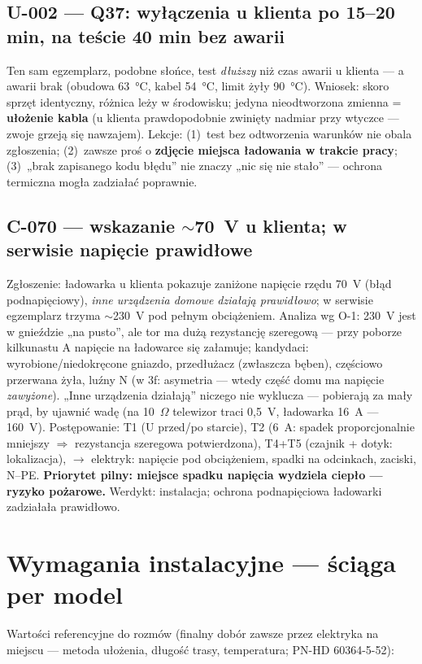\documentclass[11pt]{article}
\newcommand{\key}[1]{\textbf{\color{navy}#1}}
\newcommand{\warn}[1]{\textbf{\color{warnred}#1}}
\begin{document}
\subsection{U-002 — Q37: wyłączenia u klienta po 15--20 min, na teście 40 min bez awarii}
Ten sam egzemplarz, podobne słońce, test \emph{dłuższy} niż czas awarii u klienta — a awarii brak (obudowa 63~°C, kabel 54~°C, limit żyły 90~°C). Wniosek: skoro sprzęt identyczny, różnica leży w środowisku; jedyna nieodtworzona zmienna = \key{ułożenie kabla} (u klienta prawdopodobnie zwinięty nadmiar przy wtyczce — zwoje grzeją się nawzajem). Lekcje: (1)~test bez odtworzenia warunków nie obala zgłoszenia; (2)~zawsze proś o \key{zdjęcie miejsca ładowania w trakcie pracy}; (3)~„brak zapisanego kodu błędu'' nie znaczy „nic się nie stało'' — ochrona termiczna mogła zadziałać poprawnie.

\subsection{C-070 — wskazanie $\sim$70~V u klienta; w serwisie napięcie prawidłowe}
Zgłoszenie: ładowarka u klienta pokazuje zaniżone napięcie rzędu 70~V (błąd podnapięciowy), \emph{inne urządzenia domowe działają prawidłowo}; w serwisie egzemplarz trzyma $\sim$230~V pod pełnym obciążeniem. Analiza wg O-1: 230~V jest w gnieździe „na pusto'', ale tor ma dużą rezystancję szeregową — przy poborze kilkunastu A napięcie na ładowarce się załamuje; kandydaci: wyrobione/niedokręcone gniazdo, przedłużacz (zwłaszcza bęben), częściowo przerwana żyła, luźny N (w 3f: asymetria — wtedy część domu ma napięcie \emph{zawyżone}). „Inne urządzenia działają'' niczego nie wyklucza — pobierają za mały prąd, by ujawnić wadę (na 10~$\Omega$ telewizor traci 0,5~V, ładowarka 16~A — 160~V). Postępowanie: T1 (U przed/po starcie), T2 (6~A: spadek proporcjonalnie mniejszy $\Rightarrow$ rezystancja szeregowa potwierdzona), T4+T5 (czajnik + dotyk: lokalizacja), $\rightarrow$ elektryk: napięcie pod obciążeniem, spadki na odcinkach, zaciski, N--PE. \warn{Priorytet pilny: miejsce spadku napięcia wydziela ciepło — ryzyko pożarowe.} Werdykt: instalacja; ochrona podnapięciowa ładowarki zadziałała prawidłowo.

\section{Wymagania instalacyjne — ściąga per model}\label{sec:wymagania}
Wartości referencyjne do rozmów (finalny dobór zawsze przez elektryka na miejscu — metoda ułożenia, długość trasy, temperatura; PN-HD 60364-5-52):
\end{document}
